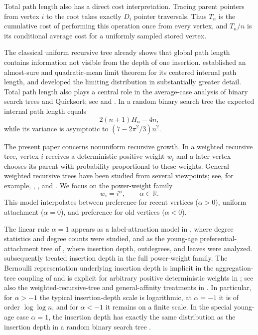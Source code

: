 \documentclass[11pt,a4paper]{article}
\newcommand{\1}{\mathbf{1}}
\newcommand{\R}{\mathbb{R}}
\begin{document}
Total path length also has a direct cost interpretation.
Tracing parent pointers from vertex $i$ to the root takes exactly $D_i$ pointer traversals.
Thus $T_n$ is the cumulative cost of performing this operation once from every vertex,
and $T_n/n$ is its conditional average cost for a uniformly sampled stored vertex.

The classical uniform recursive tree already shows that global path length
contains information not visible from the depth of one insertion.
\citet{Mahmoud1991} established an almost-sure and quadratic-mean limit theorem
for its centered internal path length, and \citet{DobrowFill1999} developed
the limiting distribution in substantially greater detail.  Total path
length also plays a central role in the average-case analysis of binary search
trees and Quicksort; see \citet{Knuth1998} and
\citet{FlajoletSedgewick2009}.  In a random binary search tree the expected
internal path length equals
\[
2(n+1)H_n-4n,
\]
while its variance is asymptotic to
$(7-2\pi^2/3)n^2$.

The present paper concerns nonuniform recursive growth.  In a weighted
recursive tree, vertex $i$ receives a deterministic positive weight $w_i$ and
a later vertex chooses its parent with probability proportional to these
weights.  General weighted recursive trees have been studied from several
viewpoints; see, for example, \citet{BorovkovVatutin2006},
\citet{HiesmayrIslak2020}, and \citet{Senizergues2021}.  We focus on the
power-weight family
\[
w_i=i^\alpha,\qquad \alpha\in\R.
\]
This model interpolates between preference for recent vertices
($\alpha>0$), uniform attachment ($\alpha=0$), and preference for old
vertices ($\alpha<0$).

The linear rule $\alpha=1$ appears as a label-attraction model in
\citet{GalazkaEtAl2020}, where degree statistics and degree counts were
studied, and as the young-age preferential-attachment tree of
\citet{LyonMahmoud2020}, where insertion depth, outdegrees, and leaves were
analyzed.  \citet{LyonMahmoud2022} subsequently treated insertion depth in the
full power-weight family.  The Bernoulli representation underlying insertion
depth is implicit in the aggregation-tree coupling of
\citet[equation~(2.2)]{CurienHaas2017} and is explicit for arbitrary positive
deterministic weights in \citet[Corollary~8]{MaillerUribeBravo2019}; see also
the weighted-recursive-tree and general-affinity treatments in
\citet{Senizergues2021,NakataMahmoud2024}.  In particular, for
$\alpha>-1$ the typical insertion-depth scale is logarithmic, at
$\alpha=-1$ it is of order $\log\log n$, and for $\alpha<-1$ it remains on a
finite scale.  In the special young-age case $\alpha=1$, the insertion depth
has exactly the same distribution as the insertion depth in a random binary
search tree \citep{LyonMahmoud2020}.
\end{document}

